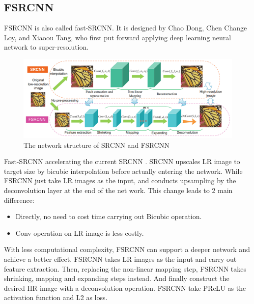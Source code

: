 \documentclass{article}
\begin{document}
  \subsection{FSRCNN}
  FSRCNN \cite{1} is also called fast-SRCNN. 
  It is designed by Chao Dong, Chen Change Loy, and Xiaoou Tang, 
  who first put forward applying deep learning neural network to super-resolution. 
  \begin{figure}[H]
      \centering
      \includegraphics[scale = 0.4]{images/FSRCNN.png}
      \caption{The network structure of SRCNN and FSRCNN}
  \end{figure}
  Fast-SRCNN accelerating the current SRCNN \cite{6}. 
  SRCNN upscales LR image to target size by bicubic interpolation before actually entering the network. 
  While FSRCNN just take LR images as the input, and conducts upsampling by the deconvolution layer at the end of the net work. 
  This change leads to 2 main difference: 
  \begin{itemize}
      \item Directly, no need to cost time carrying out Bicubic operation.
      \item Conv operation on LR image is less costly.
  \end{itemize}
  With less computational complexity, FSRCNN can support a deeper network and achieve a better effect.
  FSRCNN takes LR images as the input and carry out feature extraction. 
  Then, replacing the non-linear mapping step, FSRCNN takes shrinking, mapping and expanding steps instead. 
  And finally construct the desired HR image with a deconvolution operation. 
  FSRCNN take PReLU as the activation function and L2 as loss.
  
\end{document}
